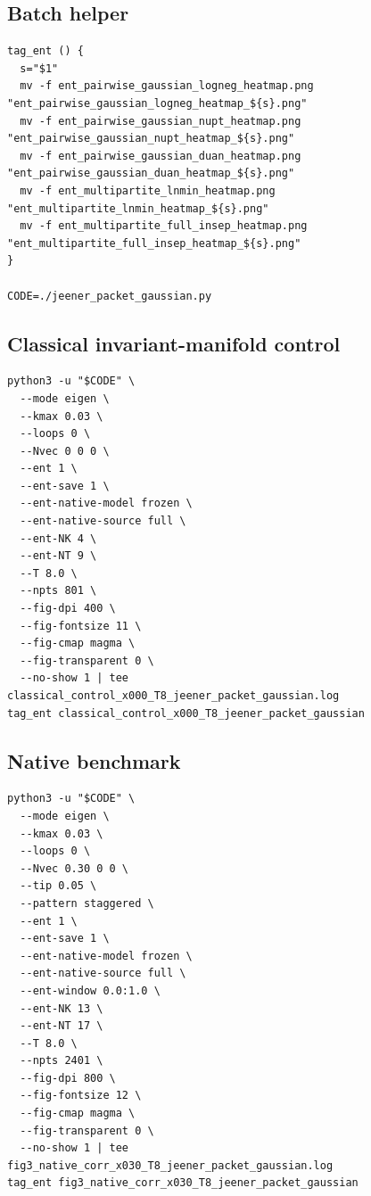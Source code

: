 \documentclass[11pt]{article}
\begin{document}
\subsection{Batch helper}
\begin{lstlisting}[style=bashstyle]
tag_ent () {
  s="$1"
  mv -f ent_pairwise_gaussian_logneg_heatmap.png  "ent_pairwise_gaussian_logneg_heatmap_${s}.png"
  mv -f ent_pairwise_gaussian_nupt_heatmap.png    "ent_pairwise_gaussian_nupt_heatmap_${s}.png"
  mv -f ent_pairwise_gaussian_duan_heatmap.png    "ent_pairwise_gaussian_duan_heatmap_${s}.png"
  mv -f ent_multipartite_lnmin_heatmap.png        "ent_multipartite_lnmin_heatmap_${s}.png"
  mv -f ent_multipartite_full_insep_heatmap.png   "ent_multipartite_full_insep_heatmap_${s}.png"
}

CODE=./jeener_packet_gaussian.py
\end{lstlisting}

\subsection{Classical invariant-manifold control}
\begin{lstlisting}[style=bashstyle]
python3 -u "$CODE" \
  --mode eigen \
  --kmax 0.03 \
  --loops 0 \
  --Nvec 0 0 0 \
  --ent 1 \
  --ent-save 1 \
  --ent-native-model frozen \
  --ent-native-source full \
  --ent-NK 4 \
  --ent-NT 9 \
  --T 8.0 \
  --npts 801 \
  --fig-dpi 400 \
  --fig-fontsize 11 \
  --fig-cmap magma \
  --fig-transparent 0 \
  --no-show 1 | tee classical_control_x000_T8_jeener_packet_gaussian.log
tag_ent classical_control_x000_T8_jeener_packet_gaussian
\end{lstlisting}

\subsection{Native benchmark}
\begin{lstlisting}[style=bashstyle]
python3 -u "$CODE" \
  --mode eigen \
  --kmax 0.03 \
  --loops 0 \
  --Nvec 0.30 0 0 \
  --tip 0.05 \
  --pattern staggered \
  --ent 1 \
  --ent-save 1 \
  --ent-native-model frozen \
  --ent-native-source full \
  --ent-window 0.0:1.0 \
  --ent-NK 13 \
  --ent-NT 17 \
  --T 8.0 \
  --npts 2401 \
  --fig-dpi 800 \
  --fig-fontsize 12 \
  --fig-cmap magma \
  --fig-transparent 0 \
  --no-show 1 | tee fig3_native_corr_x030_T8_jeener_packet_gaussian.log
tag_ent fig3_native_corr_x030_T8_jeener_packet_gaussian
\end{lstlisting}
\end{document}
